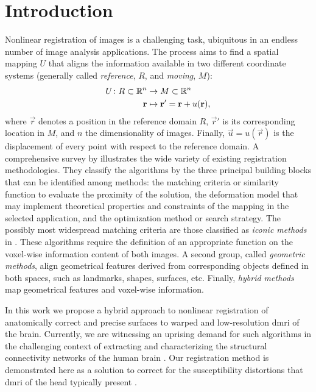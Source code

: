 \section*{Introduction}
\label{sec:introduction}

Nonlinear registration of images is a challenging task, ubiquitous
  in an endless number of image analysis applications.
The process aims to find a spatial mapping $U$ that aligns the information available
  in two different coordinate systems (generally called
  \emph{reference}, $R$, and \emph{moving}, $M$):
  \begin{align}
  U\colon R \subset \mathbb{R}^n &\to M \subset \mathbb{R}^n \notag\\
  \vec{r} &\mapsto \vec{r}' =\vec{r}+u(\vec{r}),
  \label{eq:transform}
  \end{align}
  where $\vec{r}$ denotes a position in the reference domain $R$, $\vec{r}'$ is
  its corresponding location in $M$, and $n$ the dimensionality of images.
Finally, $\vec{u} = u(\vec{r})$ is the displacement of every point with respect
  to the reference domain.
A comprehensive survey by \cite{sotiras_deformable_2013}
  illustrates the wide variety of existing registration methodologies.
They classify the algorithms by the three principal building blocks that can be identified
  among methods: the matching criteria or similarity function to evaluate the proximity of
  the solution, the deformation model that may implement theoretical properties and constraints
  of the mapping in the selected application, and the optimization method or search strategy.
The possibly most widespread matching criteria are those classified as \emph{iconic
  methods} in \citep{sotiras_deformable_2013}.
These algorithms require the definition of an appropriate function on the voxel-wise information
  content of both images.
A second group, called \emph{geometric methods}, align geometrical features derived from
  corresponding objects defined in both spaces, such as landmarks, shapes, surfaces, etc.
Finally, \emph{hybrid methods} map geometrical features and voxel-wise information.

In this work we propose a hybrid approach to nonlinear registration of anatomically correct
  and precise surfaces to warped and low-resolution \gls*{dmri} of the brain.
Currently, we are witnessing an uprising demand for such algorithms in the challenging context
  of extracting and characterizing the structural connectivity networks of the
  human brain \citep{craddock_imaging_2013}.
Our registration method is demonstrated here as a solution to correct for the susceptibility
  distortions that \gls*{dmri} of the head typically present \citep{jezzard_correction_1995}.

